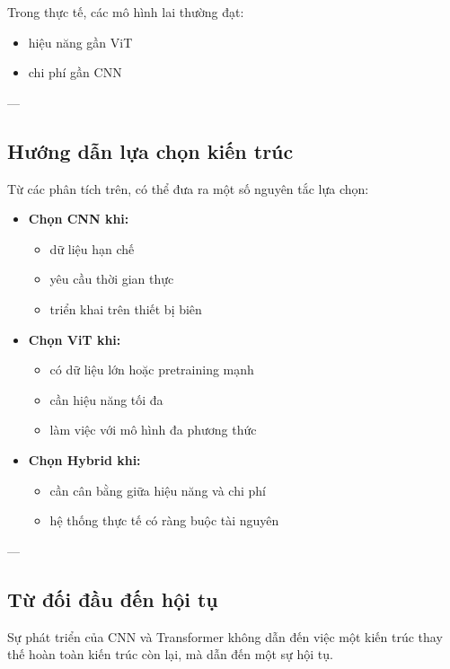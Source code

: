 Trong thực tế, các mô hình lai thường đạt:
\begin{itemize}
	\item hiệu năng gần ViT
	\item chi phí gần CNN
\end{itemize}

---

\subsection{Hướng dẫn lựa chọn kiến trúc}
\label{subsec:practical_guidelines}

Từ các phân tích trên, có thể đưa ra một số nguyên tắc lựa chọn:

\begin{itemize}
	\item \textbf{Chọn CNN khi:}
	\begin{itemize}
		\item dữ liệu hạn chế
		\item yêu cầu thời gian thực
		\item triển khai trên thiết bị biên
	\end{itemize}
	
	\item \textbf{Chọn ViT khi:}
	\begin{itemize}
		\item có dữ liệu lớn hoặc pretraining mạnh
		\item cần hiệu năng tối đa
		\item làm việc với mô hình đa phương thức
	\end{itemize}
	
	\item \textbf{Chọn Hybrid khi:}
	\begin{itemize}
		\item cần cân bằng giữa hiệu năng và chi phí
		\item hệ thống thực tế có ràng buộc tài nguyên
	\end{itemize}
\end{itemize}

---

\subsection{Từ đối đầu đến hội tụ}
\label{subsec:unified_future_conclusion}

Sự phát triển của CNN và Transformer không dẫn đến việc một kiến trúc thay thế hoàn toàn kiến trúc còn lại, mà dẫn đến một sự hội tụ.

